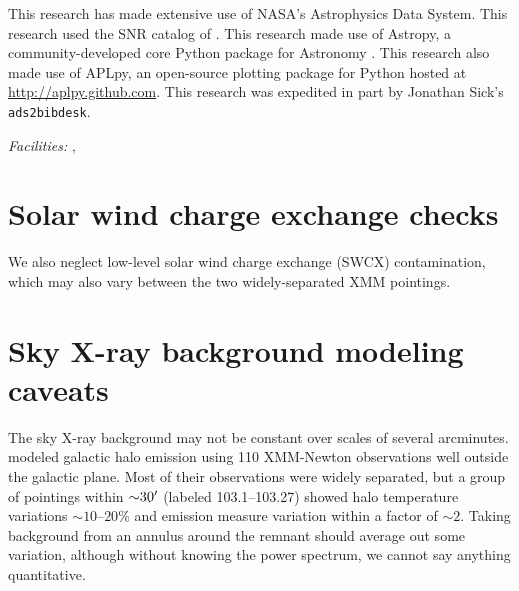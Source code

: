 \documentclass[preprint2,tighten,trackchanges]{aastex6}
\newcommand*{\abt}{\mathord{\sim}} %
\begin{document}
This research has made extensive use of NASA's Astrophysics Data System.
This research used the SNR catalog of \citet{ferrand2012}.
This research made use of Astropy, a community-developed core Python package
for Astronomy \citep{astropy2013}.
This research also made use of APLpy, an open-source plotting package for
Python hosted at \href{http://aplpy.github.com}{http://aplpy.github.com}.
This research was expedited in part by Jonathan Sick's \texttt{ads2bibdesk}.

{\it Facilities:} , 





\clearpage  %
\appendix

\setcounter{table}{0}
\renewcommand{\thetable}{A\arabic{table}}
\setcounter{figure}{0}
\renewcommand{\thefigure}{A\arabic{figure}}

\section{Solar wind charge exchange checks}

We also neglect low-level solar wind charge exchange (SWCX) contamination,
which may also vary between the two widely-separated XMM pointings.


\section{Sky X-ray background modeling caveats}

The sky X-ray background may not be constant over scales of several arcminutes.
\citet{henley2013} modeled galactic halo emission using 110 XMM-Newton
observations well outside the galactic plane.
Most of their observations were widely separated, but a group of pointings
within $\abt 30\arcmin$ (labeled 103.1--103.27) showed halo temperature
variations $\abt 10$--$20\%$ and emission measure variation within a factor of
$\abt 2$.
Taking background from an annulus around the remnant should average out some
variation, although without knowing the power spectrum, we cannot say anything
quantitative.
\end{document}
